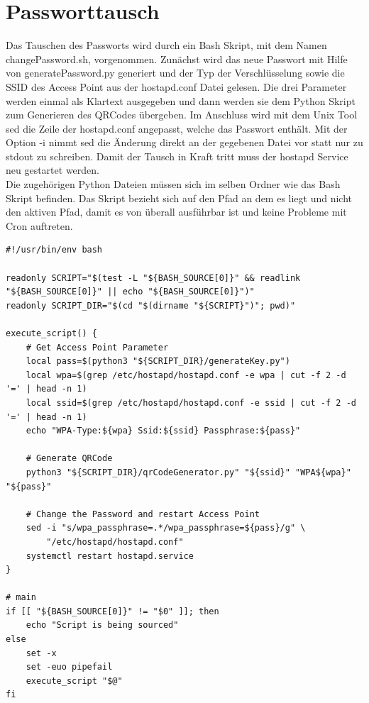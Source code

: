 \documentclass[a4paper,11pt,singlespacing]{article}
\begin{document}
    	
    	\section{Passworttausch}
    		Das Tauschen des Passworts wird durch ein Bash Skript, mit dem Namen changePassword.sh, vorgenommen. Zunächst wird das neue Passwort mit Hilfe von generatePassword.py generiert und der Typ der Verschlüsselung sowie die SSID des Access Point aus der hostapd.conf Datei gelesen. Die drei Parameter werden einmal als Klartext ausgegeben und dann werden sie dem Python Skript zum Generieren des QRCodes übergeben. Im Anschluss wird mit dem Unix Tool sed die Zeile der hostapd.conf angepasst, welche das Passwort enthält. Mit der Option -i nimmt sed die Änderung direkt an der gegebenen Datei vor statt nur zu stdout zu schreiben. Damit der Tausch in Kraft tritt muss der hostapd Service neu gestartet werden. \\ 
    		Die zugehörigen Python Dateien müssen sich im selben Ordner wie das Bash Skript befinden. Das Skript bezieht sich auf den Pfad an dem es liegt und nicht den aktiven Pfad, damit es von überall ausführbar ist und keine Probleme mit Cron auftreten.  \\
    	\begin{lstlisting}
#!/usr/bin/env bash

readonly SCRIPT="$(test -L "${BASH_SOURCE[0]}" && readlink "${BASH_SOURCE[0]}" || echo "${BASH_SOURCE[0]}")"
readonly SCRIPT_DIR="$(cd "$(dirname "${SCRIPT}")"; pwd)"

execute_script() {
	# Get Access Point Parameter
	local pass=$(python3 "${SCRIPT_DIR}/generateKey.py")         
	local wpa=$(grep /etc/hostapd/hostapd.conf -e wpa | cut -f 2 -d '=' | head -n 1)
	local ssid=$(grep /etc/hostapd/hostapd.conf -e ssid | cut -f 2 -d '=' | head -n 1)
	echo "WPA-Type:${wpa} Ssid:${ssid} Passphrase:${pass}" 

	# Generate QRCode
	python3 "${SCRIPT_DIR}/qrCodeGenerator.py" "${ssid}" "WPA${wpa}" "${pass}"

	# Change the Password and restart Access Point
	sed -i "s/wpa_passphrase=.*/wpa_passphrase=${pass}/g" \
		"/etc/hostapd/hostapd.conf"
	systemctl restart hostapd.service
}

# main
if [[ "${BASH_SOURCE[0]}" != "$0" ]]; then
	echo "Script is being sourced"
else
	set -x
	set -euo pipefail
	execute_script "$@"
fi  	
    	\end{lstlisting}
\end{document}
